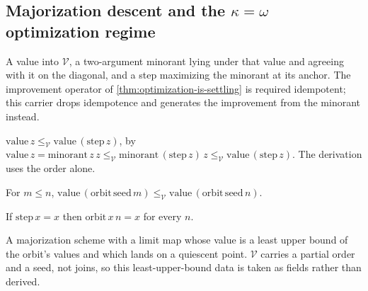 \subsection{Majorization descent and the \(\kappa=\omega\) optimization regime}

\begin{theorem}\label{thm:majorization-scheme}\leanok{}
A value into \(\mathcal{V}\), a two-argument minorant lying under that value and agreeing with it
on the diagonal, and a step maximizing the minorant at its anchor. The improvement operator of
\ref{thm:optimization-is-settling} is required idempotent; this carrier drops idempotence and
generates the improvement from the minorant instead.
\end{theorem}

\begin{theorem}\label{thm:majorization-step-inflationary}\leanok{}
\(\mathrm{value}\,z \le_{\mathcal{V}} \mathrm{value}\,(\mathrm{step}\,z)\), by
\(\mathrm{value}\,z = \mathrm{minorant}\,z\,z \le_{\mathcal{V}} \mathrm{minorant}\,(\mathrm{step}\,z)\,z
\le_{\mathcal{V}} \mathrm{value}\,(\mathrm{step}\,z)\). The derivation uses the order alone.
\end{theorem}

\begin{theorem}\label{thm:majorization-orbit-chain}\leanok{}
For \(m \le n\), \(\mathrm{value}\,(\mathrm{orbit}\,\mathrm{seed}\,m) \le_{\mathcal{V}}
\mathrm{value}\,(\mathrm{orbit}\,\mathrm{seed}\,n)\).
\end{theorem}

\begin{theorem}\label{thm:majorization-quiescent-orbit-const}\leanok{}
If \(\mathrm{step}\,x = x\) then \(\mathrm{orbit}\,x\,n = x\) for every \(n\).
\end{theorem}

\begin{theorem}\label{thm:settled-scheme-carrier}\leanok{}
A majorization scheme with a limit map whose value is a least upper bound of the orbit's values and
which lands on a quiescent point. \(\mathcal{V}\) carries a partial order and a seed, not joins, so
this least-upper-bound data is taken as fields rather than derived.
\end{theorem}

